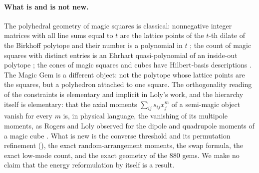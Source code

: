 \paragraph{What is and is not new.}
The polyhedral geometry of magic squares is classical: nonnegative integer matrices with all line sums equal to $t$ are the lattice points of the $t$-th dilate of the Birkhoff polytope and their number is a polynomial in $t$ \cite{stanley1973magic,ehrhart1973magic}; the count of magic squares with distinct entries is an Ehrhart quasi-polynomial of an inside-out polytope \cite{beck2006insideout,beck2010enumeration}; the cones of magic squares and cubes have Hilbert-basis descriptions \cite{ahmed2003polyhedral}.
The Magic Gem is a different object: not the polytope whose lattice points are the squares, but a polyhedron attached to one square.
The orthogonality reading of the constraints is elementary and implicit in Loly's work, and the hierarchy itself is elementary: that the axial moments $\sum_{ij}s_{ij}x_j^m$ of a semi-magic object vanish for every $m$ is, in physical language, the vanishing of its multipole moments, as Rogers and Loly observed for the dipole and quadrupole moments of a magic cube \cite{rogers2005multipole}.
What is new is the converse threshold and its permutation refinement (), the exact random-arrangement moments, the swap formula, the exact low-mode count, and the exact geometry of the $880$ gems.
We make no claim that the energy reformulation by itself is a result.

